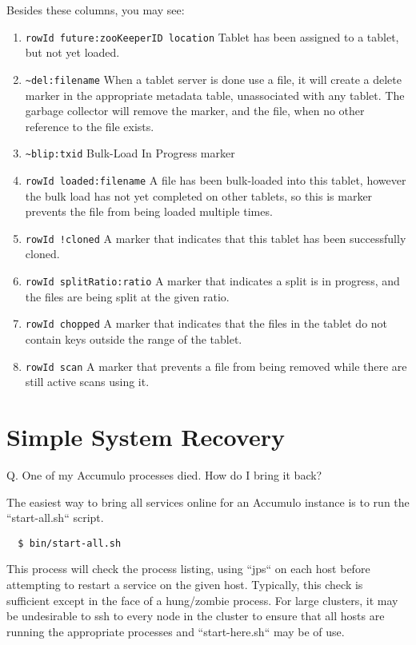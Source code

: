 Besides these columns, you may see:

\begin{enumerate}
\item{\texttt{rowId future:zooKeeperID location} Tablet has been assigned to a tablet, but not yet loaded.}
\item{\texttt{\textasciitilde{}del:filename} When a tablet server is done use a file, it will create a delete marker in the appropriate metadata table, unassociated with any tablet.  The garbage collector will remove the marker, and the file, when no other reference to the file exists.}
\item{\texttt{\textasciitilde{}blip:txid} Bulk-Load In Progress marker}
\item{\texttt{rowId loaded:filename} A file has been bulk-loaded into this tablet, however the bulk load has not yet completed on other tablets, so this is marker prevents the file from being loaded multiple times.}
\item{\texttt{rowId !cloned} A marker that indicates that this tablet has been successfully cloned.}
\item{\texttt{rowId splitRatio:ratio} A marker that indicates a split is in progress, and the files are being split at the given ratio.}
\item{\texttt{rowId chopped} A marker that indicates that the files in the tablet do not contain keys outside the range of the tablet.}
\item{\texttt{rowId scan} A marker that prevents a file from being removed while there are still active scans using it.}

\end{enumerate}

\section{Simple System Recovery}

Q. One of my Accumulo processes died. How do I bring it back?

The easiest way to bring all services online for an Accumulo instance is to run the ``start-all.sh`` script.

\begingroup\fontsize{8pt}{8pt}\selectfont\begin{verbatim}
  $ bin/start-all.sh
\end{verbatim}\endgroup

This process will check the process listing, using ``jps`` on each host before attempting to restart a service on the given host.
Typically, this check is sufficient except in the face of a hung/zombie process. For large clusters, it may be
undesirable to ssh to every node in the cluster to ensure that all hosts are running the appropriate processes and ``start-here.sh`` may be of use.

